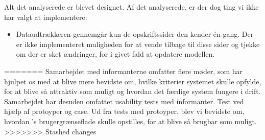 Alt det analyserede er blevet designet. Af det analyserede, er der dog ting vi ikke har valgt at implementere:
\begin{itemize}
\item Dataudtrækkeren gennemgår kun de opskriftssider den kender én gang. Der er ikke implementeret muligheden for at vende tilbage til disse sider og tjekke om der er sket ændringer, for i givet fald at opdatere modellen.
\end{itemize}
=======
Samarbejdet med informanterne omfatter flere møder, som har hjulpet os med at blive mere bevidste om, hvilke kriterier systemet skulle opfylde, for at blive så attraktiv som muligt og hvordan det færdige system fungere i drift. Samarbejdet har desuden omfattet usability tests med informanter. Test ved hjælp af protoyper og case. Ud fra tests med protoyper, blev vi bevidste om, hvordan \Foodl{}'s brugergrænseflade skulle opstilles, for at blive så brugbar som muligt. 
>>>>>>> Stashed changes


